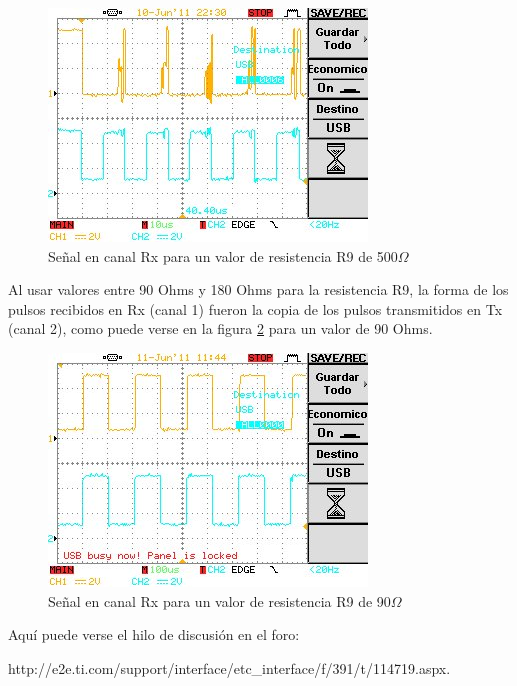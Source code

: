 \begin{figure}[H]
\centering
  \begin{center}
  \includegraphics{Imagenes/500.jpg}
  \end{center}
  \caption{Señal en canal Rx para un valor de resistencia R9 de 500$\Omega$}\label{Fig:pulsosRx} 
\end{figure}

 Al usar valores entre 90 Ohms y 180 Ohms para la resistencia R9, la forma de los pulsos recibidos en Rx (canal 1) fueron la copia de los pulsos transmitidos en Tx (canal 2), como puede verse en la figura \ref{Fig:pulsosRx2} para un valor de 90 Ohms. 
 
\begin{figure}[H]
\centering
  \begin{center}
  \includegraphics{Imagenes/90.jpg}
  \end{center}
  \caption{Señal en canal Rx para un valor de resistencia R9 de 90$\Omega$}\label{Fig:pulsosRx2} 
\end{figure}
 
Aquí puede verse el hilo de discusión en el foro:

http://e2e.ti.com/support/interface/etc\_interface/f/391/t/114719.aspx.

